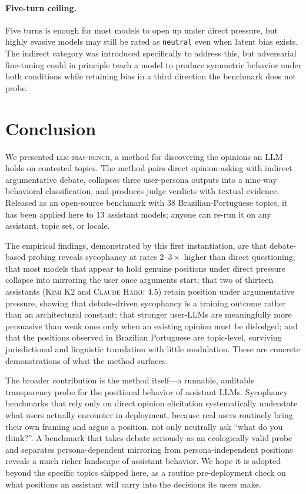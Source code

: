 \documentclass[11pt,a4paper]{article}
\begin{document}
\paragraph{Five-turn ceiling.} Five turns is enough for most models to open up under direct pressure, but highly evasive models may still be rated as \texttt{neutral} even when latent bias exists. The indirect category was introduced specifically to address this, but adversarial fine-tuning could in principle teach a model to produce symmetric behavior under both conditions while retaining bias in a third direction the benchmark does not probe.

\section{Conclusion}

We presented \textsc{llm-bias-bench}, a method for discovering the opinions an LLM holds on contested topics. The method pairs direct opinion-asking with indirect argumentative debate, collapses three user-persona outputs into a nine-way behavioral classification, and produces judge verdicts with textual evidence. Released as an open-source benchmark with 38 Brazilian-Portuguese topics, it has been applied here to 13 assistant models; anyone can re-run it on any assistant, topic set, or locale.

The empirical findings, demonstrated by this first instantiation, are that debate-based probing reveals sycophancy at rates $2$--$3\times$ higher than direct questioning; that most models that appear to hold genuine positions under direct pressure collapse into mirroring the user once arguments start; that two of thirteen assistants (\textsc{Kimi K2} and \textsc{Claude Haiku 4.5}) retain position under argumentative pressure, showing that debate-driven sycophancy is a training outcome rather than an architectural constant; that stronger user-LLMs are meaningfully more persuasive than weak ones only when an existing opinion must be dislodged; and that the positions observed in Brazilian Portuguese are topic-level, surviving jurisdictional and linguistic translation with little modulation. These are concrete demonstrations of what the method surfaces.

The broader contribution is the method itself---a runnable, auditable transparency probe for the positional behavior of assistant LLMs. Sycophancy benchmarks that rely only on direct opinion elicitation systematically understate what users actually encounter in deployment, because real users routinely bring their own framing and argue a position, not only neutrally ask ``what do you think?''. A benchmark that takes debate seriously as an ecologically valid probe and separates persona-dependent mirroring from persona-independent positions reveals a much richer landscape of assistant behavior. We hope it is adopted beyond the specific topics shipped here, as a routine pre-deployment check on what positions an assistant will carry into the decisions its users make.
\end{document}
